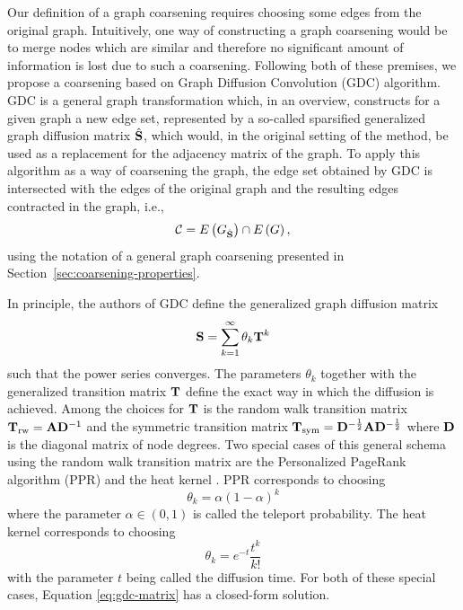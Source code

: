 Our definition of a graph coarsening requires choosing some edges from the original graph. Intuitively, one way of constructing a graph coarsening would be to merge nodes which are similar and therefore no significant amount of information is lost due to such a coarsening. Following both of these premises, we propose a coarsening based on Graph Diffusion Convolution (GDC) \cite{gasteiger_diffusion_2019} algorithm. GDC is a general graph transformation which, in an overview, constructs for a given graph a new edge set, represented by a so-called sparsified generalized graph diffusion matrix \( \hat{\mathbf{S}} \), which would, in the original setting of the method, be used as a replacement for the adjacency matrix of the graph. To apply this algorithm as a way of coarsening the graph, the edge set obtained by GDC is intersected with the edges of the original graph and the resulting edges contracted in the graph, i.e.,
\[ \mathcal{C} = E \left( G_{\hat{\mathbf{S}}} \right) \cap E \left( G \right), \]
using the notation of a general graph coarsening presented in Section~\ref{sec:coarsening-properties}.

In principle, the authors of GDC define the generalized graph diffusion matrix
\begin{equation}\label{eq:gdc-matrix}
    \mathbf{S} = \sum_{k = 1}^\infty \theta_k \mathbf{T}^k
\end{equation}
such that the power series converges. The parameters \( \theta_k \) together with the generalized transition matrix \( \mathbf{T} \) define the exact way in which the diffusion is achieved. Among the choices for \( \mathbf{T} \) is the random walk transition matrix \( \mathbf{T}_ \mathrm{rw} = \mathbf{A} \mathbf{D}^{-1} \) and the symmetric transition matrix \( \mathbf{T}_\mathrm{sym} = \mathbf{D}^{-\frac{1}{2}} \mathbf{A} \mathbf{D}^{-\frac{1}{2}} \) where \( \mathbf{D} \) is the diagonal matrix of node degrees. Two special cases of this general schema using the random walk transition matrix are the Personalized PageRank algorithm (PPR) \cite{page_pagerank_1999} and the heat kernel \cite{kondor_diffusion_2002}. PPR corresponds to choosing
\[ \theta_k = \alpha \left( 1 - \alpha \right)^k \]
where the parameter \( \alpha \in \left( 0, 1 \right) \) is called the teleport probability. The heat kernel corresponds to choosing
\[ \theta_k = e^{-t} \frac{t^k}{k!} \]
with the parameter \( t \) being called the diffusion time. For both of these special cases, Equation \ref{eq:gdc-matrix} has a closed-form solution.

